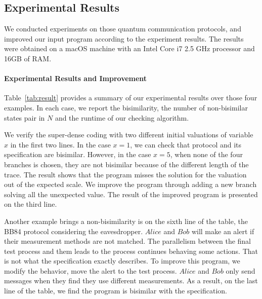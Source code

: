 \documentclass[a4paper,UKenglish,cleveref, autoref]{lipics-v2019}
\begin{document}
\subsection{Experimental Results}
We conducted experiments on those quantum communication protocols, and improved our input program according to the experiment results. The results were obtained on a macOS machine with an Intel Core i7 2.5 GHz processor and 16GB of RAM.
\paragraph*{Experimental Results and Improvement}Table~\ref{tab:result} provides a summary of our experimental results over those four examples. In each case, we report the bisimilarity, the number of non-bisimilar states pair in $N$ and the runtime of our checking algorithm.

We verify the super-dense coding with two different initial valuations of variable $x$ in the first two lines. In the case $x=1$, we can check that protocol and its specification are bisimilar. However, in the case $x=5$, when none of the four branches is chosen, they are not bisimilar because of the different length of the trace. The result shows that the program misses the solution for the valuation out of the expected scale. We improve the program through adding a new branch solving all the unexpected value. The result of the improved program is presented on the third line. 

Another example brings a non-bisimilarity is on the sixth line of the table, the BB84 protocol considering the eavesdropper. $Alice$ and $Bob$ will make an alert if their measurement methods are not matched. The parallelism between the final test process and them leads to the process continues behaving some actions. That is not what the specification exactly describes. To improve this program, we modify the behavior, move the alert to the test process. $Alice$ and $Bob$ only send messages when they find they use different measurements. As a result, on the last line of the table, we find the program is bisimilar with the specification.
\end{document}
